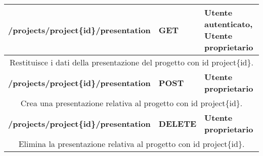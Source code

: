 \begin{table}[H]
	\begin{tabular}{|p{}|p{}|p{}|}
		\toprule
		\textbf{/projects/project\{id\}/presentation} & \textbf{GET} & \textbf{Utente autenticato, Utente proprietario} \\ \midrule
		\multicolumn{3}{|c|}{Restituisce i dati della presentazione del progetto con id project\{id\}.} \\
		\bottomrule
		\textbf{/projects/project\{id\}/presentation} & \textbf{POST} & \textbf{Utente proprietario} \\ \midrule
		\multicolumn{3}{|c|}{Crea una presentazione relativa al progetto con id project\{id\}.} \\
		\bottomrule
		\textbf{/projects/project\{id\}/presentation} & \textbf{DELETE} & \textbf{Utente proprietario} \\ \midrule
		\multicolumn{3}{|c|}{Elimina la presentazione relativa al progetto con id project\{id\}.} \\
		\bottomrule
	\end{tabular}\\
	\par\bigskip
	

\end{table}
